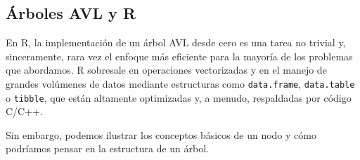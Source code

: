 \documentclass[
  spanish,
  letterpaper,
  DIV=11,
  numbers=noendperiod]{scrreprt}
\newenvironment{Shaded}{\begin{snugshade}}{\end{snugshade}}
\newcommand{\AttributeTok}[1]{\textcolor[rgb]{0.40,0.45,0.13}{#1}}
\newcommand{\CommentTok}[1]{\textcolor[rgb]{0.37,0.37,0.37}{#1}}
\newcommand{\ConstantTok}[1]{\textcolor[rgb]{0.56,0.35,0.01}{#1}}
\newcommand{\ControlFlowTok}[1]{\textcolor[rgb]{0.00,0.23,0.31}{\textbf{#1}}}
\newcommand{\DecValTok}[1]{\textcolor[rgb]{0.68,0.00,0.00}{#1}}
\newcommand{\FunctionTok}[1]{\textcolor[rgb]{0.28,0.35,0.67}{#1}}
\newcommand{\NormalTok}[1]{\textcolor[rgb]{0.00,0.23,0.31}{#1}}
\newcommand{\OtherTok}[1]{\textcolor[rgb]{0.00,0.23,0.31}{#1}}
\newcommand{\SpecialCharTok}[1]{\textcolor[rgb]{0.37,0.37,0.37}{#1}}
\begin{document}
\subsection{Árboles AVL y R}\label{uxe1rboles-avl-y-r}

En R, la implementación de un árbol AVL desde cero es una tarea no
trivial y, sinceramente, rara vez el enfoque más eficiente para la
mayoría de los problemas que abordamos. R sobresale en operaciones
vectorizadas y en el manejo de grandes volúmenes de datos mediante
estructuras como \texttt{data.frame}, \texttt{data.table} o
\texttt{tibble}, que están altamente optimizadas y, a menudo,
respaldadas por código C/C++.

Sin embargo, podemos ilustrar los conceptos básicos de un nodo y cómo
podríamos pensar en la estructura de un árbol.

\begin{Shaded}
\end{Shaded}
\end{document}
